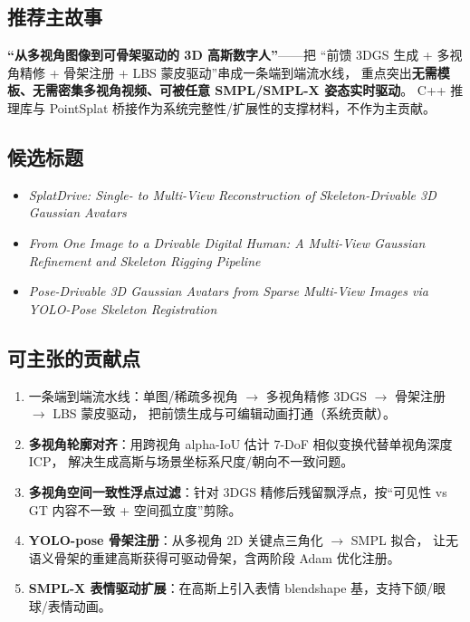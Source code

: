 \documentclass[11pt]{article}
\begin{document}
\subsection{推荐主故事}
\textbf{``从多视角图像到可骨架驱动的 3D 高斯数字人''}——把
``前馈 3DGS 生成 + 多视角精修 + 骨架注册 + LBS 蒙皮驱动''串成一条端到端流水线，
重点突出\textbf{无需模板、无需密集多视角视频、可被任意 SMPL/SMPL-X 姿态实时驱动}。
C++ 推理库与 PointSplat 桥接作为系统完整性/扩展性的支撑材料，不作为主贡献。

\subsection{候选标题}
\begin{itemize}[leftmargin=1.4em]
  \item \emph{SplatDrive: Single- to Multi-View Reconstruction of Skeleton-Drivable 3D Gaussian Avatars}
  \item \emph{From One Image to a Drivable Digital Human: A Multi-View Gaussian Refinement and Skeleton Rigging Pipeline}
  \item \emph{Pose-Drivable 3D Gaussian Avatars from Sparse Multi-View Images via YOLO-Pose Skeleton Registration}
\end{itemize}

\subsection{可主张的贡献点}
\begin{enumerate}[leftmargin=1.4em]
  \item 一条端到端流水线：单图/稀疏多视角 $\rightarrow$ 多视角精修 3DGS $\rightarrow$ 骨架注册 $\rightarrow$ LBS 蒙皮驱动，
        把前馈生成与可编辑动画打通（系统贡献）。
  \item \textbf{多视角轮廓对齐}：用跨视角 alpha-IoU 估计 7-DoF 相似变换代替单视角深度 ICP，
        解决生成高斯与场景坐标系尺度/朝向不一致问题。
  \item \textbf{多视角空间一致性浮点过滤}：针对 3DGS 精修后残留飘浮点，按``可见性 vs GT 内容不一致 + 空间孤立度''剪除。
  \item \textbf{YOLO-pose 骨架注册}：从多视角 2D 关键点三角化 $\rightarrow$ SMPL 拟合，
        让无语义骨架的重建高斯获得可驱动骨架，含两阶段 Adam 优化注册。
  \item \textbf{SMPL-X 表情驱动扩展}：在高斯上引入表情 blendshape 基，支持下颌/眼球/表情动画。
\end{enumerate}
\end{document}
